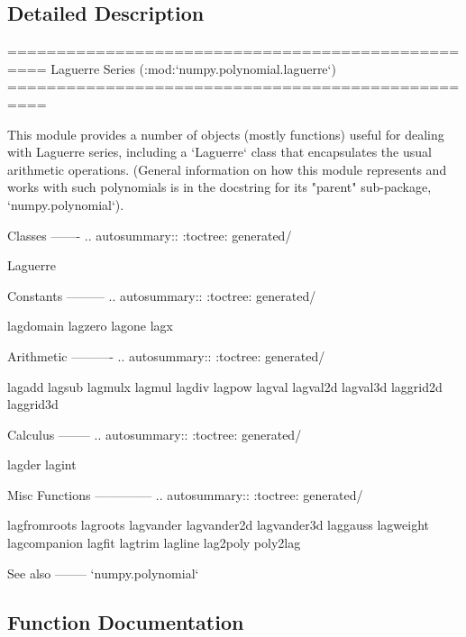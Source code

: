 \subsection{Detailed Description}
\begin{DoxyVerb}==================================================
Laguerre Series (:mod:`numpy.polynomial.laguerre`)
==================================================

This module provides a number of objects (mostly functions) useful for
dealing with Laguerre series, including a `Laguerre` class that
encapsulates the usual arithmetic operations.  (General information
on how this module represents and works with such polynomials is in the
docstring for its "parent" sub-package, `numpy.polynomial`).

Classes
-------
.. autosummary::
   :toctree: generated/

   Laguerre

Constants
---------
.. autosummary::
   :toctree: generated/

   lagdomain
   lagzero
   lagone
   lagx

Arithmetic
----------
.. autosummary::
   :toctree: generated/

   lagadd
   lagsub
   lagmulx
   lagmul
   lagdiv
   lagpow
   lagval
   lagval2d
   lagval3d
   laggrid2d
   laggrid3d

Calculus
--------
.. autosummary::
   :toctree: generated/

   lagder
   lagint

Misc Functions
--------------
.. autosummary::
   :toctree: generated/

   lagfromroots
   lagroots
   lagvander
   lagvander2d
   lagvander3d
   laggauss
   lagweight
   lagcompanion
   lagfit
   lagtrim
   lagline
   lag2poly
   poly2lag

See also
--------
`numpy.polynomial`\end{DoxyVerb}
 

\subsection{Function Documentation}
\mbox{\label{namespacenumpy_1_1polynomial_1_1laguerre_acb0d8bfcf3de2bf3fbe7d5a17f151534}} 
